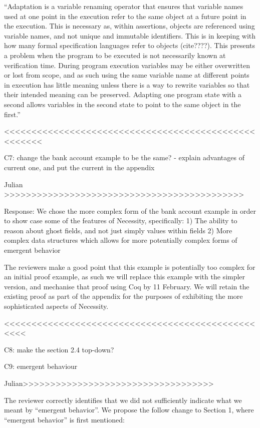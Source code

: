 ``Adaptation is a variable renaming operator that ensures that variable names used at one point in the execution refer to the same object at a future point in the execution. This is necessary as, within assertions, objects are referenced using variable names, and not unique and immutable identifiers. This is in keeping with how many formal specification languages refer to objects (cite????). This presents a problem when the program to be executed is not necessarily known at verification time. During program execution variables may be either overwritten or lost from scope, and as such using the same variable name at different points in execution has little meaning unless there is a way to rewrite variables so that their intended meaning can be preserved. Adapting one program state with a second allows variables in the second state to point to the same object in the first.''

<<<<<<<<<<<<<<<<<<<<<<<<<<<<<<<<<<<<<<<<<<<<<<<<<<<<<

C7: change the bank account example to be the same?
- explain advantages of current one, and put the current in the appendix

Julian >>>>>>>>>>>>>>>>>>>>>>>>>>>>>>>>>>>>>>>>>>>>

Response:
We chose the more complex form of the bank account example in order to show case some of the features of Necessity, specifically:
1) The ability to reason about ghost fields, and not just simply values within fields
2) More complex data structures which allows for more potentially complex forms of emergent behavior

The reviewers make a good point that this example is potentially too complex for an initial proof example, as such we will 
replace this example with the simpler version, and mechanise that proof using Coq by 11 February. We will retain the existing proof as part 
of the appendix for the purposes of exhibiting the more sophisticated aspects of Necessity.


<<<<<<<<<<<<<<<<<<<<<<<<<<<<<<<<<<<<<<<<<<<<<<<<<<

C8: make the section 2.4 top-down?

C9: emergent behaviour 

Julian>>>>>>>>>>>>>>>>>>>>>>>>>>>>>>>>>>>

The reviewer correctly identifies that we did not sufficiently indicate what we meant by ``emergent behavior''. We propose the follow change 
to Section 1, where ``emergent behavior'' is first mentioned:

